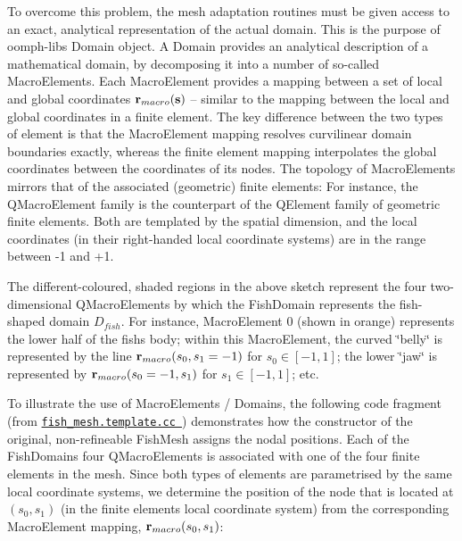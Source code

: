 To overcome this problem, the mesh adaptation routines must be given access to an exact, analytical representation of the actual domain. This is the purpose of {\ttfamily oomph-\/lib\textquotesingle{}s} {\ttfamily Domain} object. A {\ttfamily Domain} provides an analytical description of a mathematical domain, by decomposing it into a number of so-\/called {\ttfamily Macro\+Elements}. Each {\ttfamily Macro\+Element} provides a mapping between a set of local and global coordinates $ {\bf r}_{macro}({\bf s})$ -- similar to the mapping between the local and global coordinates in a finite element. The key difference between the two types of element is that the {\ttfamily Macro\+Element} mapping resolves curvilinear domain boundaries exactly, whereas the finite element mapping interpolates the global coordinates between the coordinates of its nodes. The topology of {\ttfamily Macro\+Elements} mirrors that of the associated (geometric) finite elements\+: For instance, the {\ttfamily Q\+Macro\+Element} family is the counterpart of the {\ttfamily Q\+Element} family of geometric finite elements. Both are templated by the spatial dimension, and the local coordinates (in their right-\/handed local coordinate systems) are in the range between -\/1 and +1.

The different-\/coloured, shaded regions in the above sketch represent the four two-\/dimensional {\ttfamily Q\+Macro\+Elements} by which the {\ttfamily Fish\+Domain} represents the fish-\/shaped domain $ D_{fish} $. For instance, {\ttfamily Macro\+Element} 0 (shown in orange) represents the lower half of the fish\textquotesingle{}s body; within this {\ttfamily Macro\+Element}, the curved \char`\"{}belly\char`\"{} is represented by the line $ {\bf r}_{macro}(s_0,s_1=-1)$ for $s_0\in[-1,1]$; the lower \char`\"{}jaw\char`\"{} is represented by $ {\bf r}_{macro}(s_0=-1,s_1)$ for $s_1\in[-1,1]$; etc.

To illustrate the use of {\ttfamily Macro\+Elements} / {\ttfamily Domains}, the following code fragment (from \href{../../../../src/meshes/fish_mesh.template.cc}{\tt fish\+\_\+mesh.\+template.\+cc }) demonstrates how the constructor of the original, non-\/refineable {\ttfamily Fish\+Mesh} assigns the nodal positions. Each of the {\ttfamily Fish\+Domain\textquotesingle{}s} four {\ttfamily Q\+Macro\+Elements} is associated with one of the four finite elements in the mesh. Since both types of elements are parametrised by the same local coordinate systems, we determine the position of the node that is located at $(s_0, s_1)$ (in the finite element\textquotesingle{}s local coordinate system) from the corresponding {\ttfamily Macro\+Element} mapping, ${\bf r}_{macro}(s_0, s_1)$\+:


